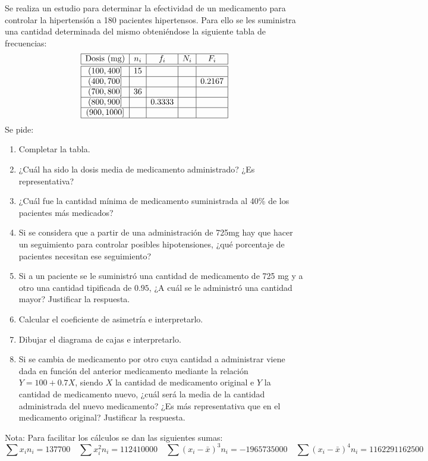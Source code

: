 \documentclass[aspectratio=149,10pt,xcolor=dvipsnames,t]{beamer}
\begin{document}
\begin{frame}[c]
\large
Se realiza un estudio para determinar la efectividad de un medicamento para controlar la hipertensión a
180 pacientes hipertensos.
Para ello se les suministra una cantidad determinada del mismo obteniéndose la siguiente tabla de frecuencias:
\[
\begin{array}{|c|c|c|c|c|}
\hline
\textrm{Dosis (mg)} & n_i & f_i & N_i & F_i\\
\hline\hline
(100,400] & 15 & & & \\
\hline
(400,700] & & & & 0.2167\\
\hline
(700,800] & 36 & & & \\
\hline
(800,900] & & 0.3333 & &\\
\hline
(900,1000] & & & & \\
\hline
\end{array}
\]
Se pide:
\begin{enumerate}
\item Completar la tabla. 
\item ¿Cuál ha sido la dosis media de medicamento administrado? ¿Es representativa?
\item ¿Cuál fue la cantidad mínima de medicamento suministrada al 40\% de los pacientes más medicados?
\end{enumerate}
\end{frame}


\begin{frame}[c]
\large
\begin{enumerate}
\setcounter{enumi}{3}
\item Si se considera que a partir de una administración de 725mg hay que hacer un seguimiento para controlar posibles
hipotensiones, ¿qué porcentaje de pacientes necesitan ese seguimiento?
\item Si a un paciente se le suministró una cantidad de medicamento de 725 mg y a otro una cantidad tipificada de
$0.95$, ¿A cuál se le administró una cantidad mayor? Justificar la respuesta. 
\item Calcular el coeficiente de asimetría e interpretarlo. 
\item Dibujar el diagrama de cajas e interpretarlo. 
\item Si se cambia de medicamento por otro cuya cantidad a administrar viene dada en función del anterior medicamento
mediante la relación $Y=100+0.7X$, siendo $X$ la cantidad de medicamento original e $Y$ la cantidad de medicamento
nuevo, ¿cuál será la media de la cantidad administrada del nuevo medicamento? ¿Es más representativa que en el
medicamento original? Justificar la respuesta.
\end{enumerate}
\noindent Nota: Para facilitar los cálculos se dan las siguientes sumas:
\[
\sum x_in_i=137700 \quad \sum x_i^2n_i=112410000 \quad \sum (x_i-\bar x)^3n_i= -1965735000 \quad \sum (x_i-\bar x)^4n_i=1162291162500
\]
\end{frame}
\end{document}
